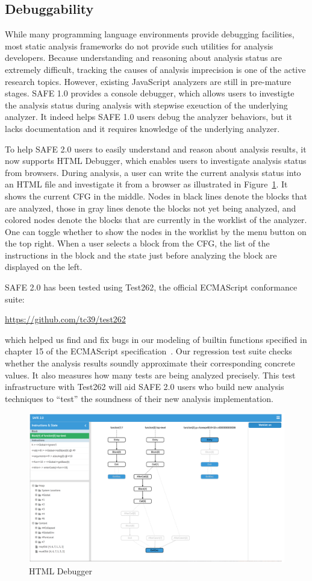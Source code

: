 \documentclass[10pt, conference]{IEEEtran}
\newcommand{\oldsafe}{{SAFE 1.0}\xspace}
\newcommand{\safe}{{SAFE 2.0}\xspace}
\newcommand{\htmldebug}{{\sf\small HTML Debugger}\xspace}
\begin{document}
\subsection{Debuggability}
While many programming language environments provide debugging
facilities, most static analysis frameworks do not provide such utilities
for analysis developers.  Because understanding and reasoning about
analysis status are extremely difficult, tracking the causes of analysis
imprecision is one of the active research topics.  However, existing
JavaScript analyzers are still in pre-mature stages.  \oldsafe provides
a console debugger, which allows users to investigte the analysis status
during analysis with stepwise exeuction of the underlying analyzer.
It indeed helps \oldsafe users debug the analyzer behaviors, but it lacks
documentation and it requires knowledge of the underlying analyzer.


To help \safe users to easily understand and reason about
analysis results, it now supports \htmldebug, which enables users
to investigate analysis status from browsers.  During analysis,
a user can write the current analysis status into an HTML file and
investigate it from a browser as illustrated in
Figure~\ref{fig:htmldebug}.  It shows the current CFG in the middle.
Nodes in black lines denote the blocks that are analyzed, those in
gray lines denote the blocks not yet being analyzed, and colored nodes
denote the blocks that are currently in the worklist of the analyzer.
One can toggle whether to show the nodes in the worklist by the menu
button on the top right.
When a user selects a block from the CFG, the list of the instructions in
the block and the state just before analyzing the block are displayed
on the left.


\safe has been tested using Test262, the official ECMAScript
conformance suite:
\begin{center}
\url{https://github.com/tc39/test262}
\end{center}
which helped us find and fix bugs in our modeling of builtin
functions specified in chapter 15 of the ECMAScript
specification~\cite{ECMA}.  Our regression test suite checks
whether the analysis results soundly approximate their corresponding
concrete values.  It also measures how many tests are being analyzed
precisely.  This test infrastructure with Test262 will aid \safe users
who build new analysis techniques to ``test'' the soundness of their
new analysis implementation.


\begin{figure}[t]
\centering
\includegraphics[width=.7\textwidth]{htmldebugger.png}
\caption{\htmldebug}\label{fig:htmldebug}
\end{figure}
\end{document}
